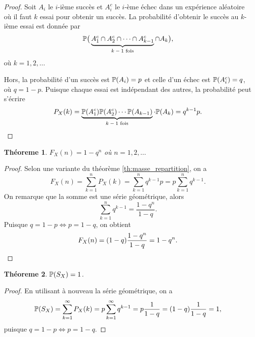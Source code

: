 \documentclass[11pt]{article}
\renewcommand\P{%
	\ensuremath{%
		\mathbb{P}%
	}%
}%
\newtheorem{theoreme}{Théoreme}[section]
\begin{document}
\begin{proof}
	Soit $A_i$ le $i$-ième succès et $A_i^c$ le $i$-ème échec dans un
	expérience aléatoire où il faut $k$ essai pour obtenir un succès. La
	probabilité d'obtenir le succès au $k$-ième essai est donnée par
	\begin{equation*}
		\P\big(
			\underbrace{A_1^c\cap A_2^c\cap\cdots\cap A_{k-1}^c}_
			\text{$k-1$ fois}\cap A_k
		\big),
	\end{equation*}
	où $k=1,2,\dots$

	Hors, la probabilité d'un succès est $\P(A_i)=p$ et celle d'un échec
	est $\P(A_i^c)=q$, où $q=1-p$. Puisque chaque essai est indépendant des
	autres, la probabilité peut s'écrire
	\begin{equation*}
		P_X(k)=
		\underbrace{\P(A_1^c)\P(A_2^c)\cdots\P(A_{k-1})}_\text{$k-1$ fois}
		\cdot\P(A_k)=q^{k-1}p.\qedhere
	\end{equation*}
\end{proof}

\begin{theoreme}\label{th:repartition_geo}
	$F_X(n)=1-q^n$ où $n=1,2,\dots$
\end{theoreme}

\begin{proof}
	Selon une variante du théorème \ref{th:masse_repartition}, on a
	\begin{equation*}
		F_X(n)=\sum_{k=1}^nP_X(k)=\sum_{k=1}^nq^{k-1}p=p\sum_{k=1}^nq^{k-1}.
	\end{equation*}
	On remarque que la somme est une série géométrique, alors
	\begin{equation*}
		\sum_{k=1}^nq^{k-1}=\frac{1-q^n}{1-q}.
	\end{equation*}
	Puisque $q=1-p\Leftrightarrow p=1-q$, on obtient
	\begin{equation*}
		F_X(n)=(1-q)\frac{1-q^n}{1-q}=1-q^n.\qedhere
	\end{equation*}
\end{proof}

\begin{theoreme}
	$\P(S_X)=1$.
\end{theoreme}

\begin{proof}
	En utilisant à nouveau la série géométrique, on a
	\begin{equation*}
		\P(S_X)
		=\sum_{k=1}^\infty P_X(k)
		=p\sum_{k=1}^\infty q^{k-1}
		=p\frac{1}{1-q}
		=(1-q)\frac{1}{1-q}
		=1,
	\end{equation*}
	puisque $q=1-p\Leftrightarrow p=1-q$.
\end{proof}
\end{document}
